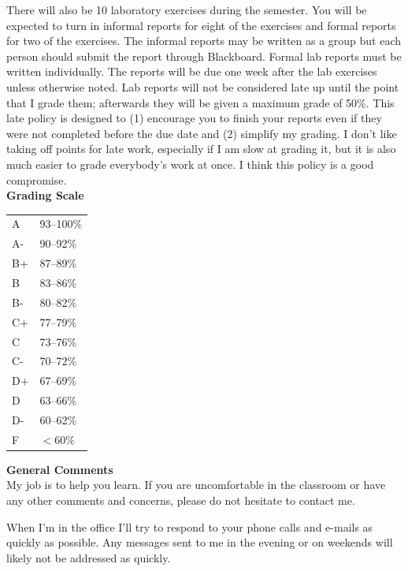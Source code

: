 \documentclass[11pt,letterpaper]{article}
\newcommand{\squeezeup}{\vspace{-2.5mm}}
\begin{document}
There will also be 10 laboratory exercises during the semester. You will be expected to turn in informal reports for eight of the exercises and formal reports for two of the exercises. The informal reports may be written as a group but each person should submit the report through Blackboard. Formal lab reports must be written individually. The reports will be due one week after the lab exercises unless otherwise noted. Lab reports will not be considered late up until the point that I grade them; afterwards they will be given a maximum grade of 50\%. This late policy is designed to (1) encourage you to finish your reports even if they were not completed before the due date and (2) simplify my grading. I don't like taking off points for late work, especially if I am slow at grading it, but it is also much easier to grade everybody's work at once. I think this policy is a good compromise.\\

\clearpage
\textbf{Grading Scale}
\begin{table}[h!]
\squeezeup
\begin{tabular}{ll}
A & 93--100\% \\
A- & 90--92\% \\
B+ & 87--89\% \\
B & 83--86\% \\
B- & 80--82\% \\
C+ & 77--79\% \\
C & 73--76\% \\
C- & 70--72\% \\
D+ & 67--69\% \\
D & 63--66\% \\
D- & 60--62\% \\
F & $<$60\%
\end{tabular}
\end{table}

\textbf{General Comments}\\
My job is to help you learn. If you are uncomfortable in the classroom or have any other comments and concerns, please do not hesitate to contact me.

When I'm in the office I'll try to respond to your phone calls and e-mails as quickly as possible. Any messages sent to me in the evening or on weekends will likely not be addressed as quickly.\\

\end{document}
